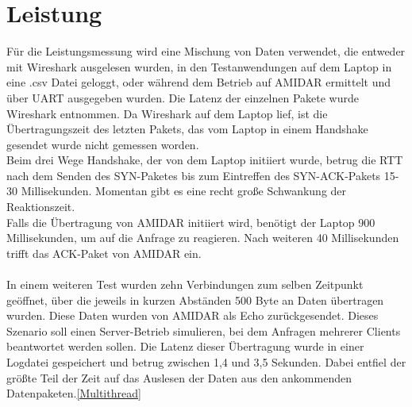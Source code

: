\section{Leistung}
Für die Leistungsmessung wird eine Mischung von Daten verwendet, die entweder mit Wireshark ausgelesen wurden, in den Testanwendungen auf dem Laptop in eine .csv Datei geloggt, oder während dem Betrieb auf AMIDAR ermittelt und über UART ausgegeben wurden. 
Die Latenz der einzelnen Pakete wurde Wireshark entnommen. Da Wireshark auf dem Laptop lief, ist die Übertragungszeit des letzten Pakets, das vom Laptop in einem Handshake gesendet wurde nicht gemessen worden. \\
Beim drei Wege Handshake, der von dem Laptop initiiert wurde, betrug die RTT nach dem Senden des SYN-Paketes bis zum Eintreffen des SYN-ACK-Pakets 15-30 Millisekunden. Momentan gibt es eine recht große Schwankung der Reaktionszeit. \\
Falls die Übertragung von AMIDAR initiiert wird, benötigt der Laptop 900 Millisekunden, um auf die Anfrage zu reagieren. Nach weiteren 40 Millisekunden trifft das ACK-Paket von AMIDAR ein.\\\\
In einem weiteren Test wurden zehn Verbindungen zum selben Zeitpunkt geöffnet, über die jeweils in kurzen Abständen 500 Byte an Daten übertragen wurden. Diese Daten wurden von AMIDAR als Echo zurückgesendet. Dieses Szenario soll einen Server-Betrieb simulieren, bei dem Anfragen mehrerer Clients beantwortet werden sollen. Die Latenz dieser Übertragung wurde in einer Logdatei gespeichert und betrug zwischen 1,4 und 3,5 Sekunden. Dabei entfiel der größte Teil der Zeit auf das Auslesen der Daten aus den ankommenden Datenpaketen.\autoref{Multithread}\\

